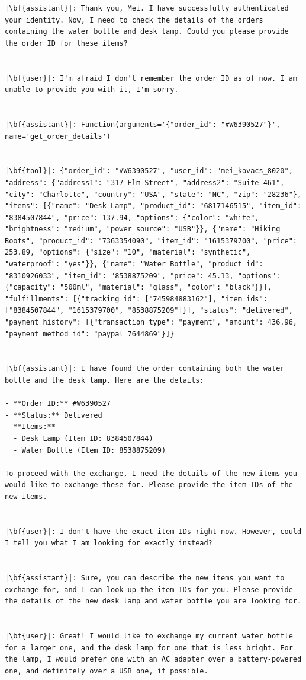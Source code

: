 \begin{longlisting}
\begin{verbatim}
|\bf{assistant}|: Thank you, Mei. I have successfully authenticated your identity. Now, I need to check the details of the orders containing the water bottle and desk lamp. Could you please provide the order ID for these items?


|\bf{user}|: I'm afraid I don't remember the order ID as of now. I am unable to provide you with it, I'm sorry.


|\bf{assistant}|: Function(arguments='{"order_id": "#W6390527"}', name='get_order_details')


|\bf{tool}|: {"order_id": "#W6390527", "user_id": "mei_kovacs_8020", "address": {"address1": "317 Elm Street", "address2": "Suite 461", "city": "Charlotte", "country": "USA", "state": "NC", "zip": "28236"}, "items": [{"name": "Desk Lamp", "product_id": "6817146515", "item_id": "8384507844", "price": 137.94, "options": {"color": "white", "brightness": "medium", "power source": "USB"}}, {"name": "Hiking Boots", "product_id": "7363354090", "item_id": "1615379700", "price": 253.89, "options": {"size": "10", "material": "synthetic", "waterproof": "yes"}}, {"name": "Water Bottle", "product_id": "8310926033", "item_id": "8538875209", "price": 45.13, "options": {"capacity": "500ml", "material": "glass", "color": "black"}}], "fulfillments": [{"tracking_id": ["745984883162"], "item_ids": ["8384507844", "1615379700", "8538875209"]}], "status": "delivered", "payment_history": [{"transaction_type": "payment", "amount": 436.96, "payment_method_id": "paypal_7644869"}]}


|\bf{assistant}|: I have found the order containing both the water bottle and the desk lamp. Here are the details:

- **Order ID:** #W6390527
- **Status:** Delivered
- **Items:**
  - Desk Lamp (Item ID: 8384507844)
  - Water Bottle (Item ID: 8538875209)

To proceed with the exchange, I need the details of the new items you would like to exchange these for. Please provide the item IDs of the new items.


|\bf{user}|: I don't have the exact item IDs right now. However, could I tell you what I am looking for exactly instead?


|\bf{assistant}|: Sure, you can describe the new items you want to exchange for, and I can look up the item IDs for you. Please provide the details of the new desk lamp and water bottle you are looking for.


|\bf{user}|: Great! I would like to exchange my current water bottle for a larger one, and the desk lamp for one that is less bright. For the lamp, I would prefer one with an AC adapter over a battery-powered one, and definitely over a USB one, if possible.



\end{verbatim}
\end{longlisting}

